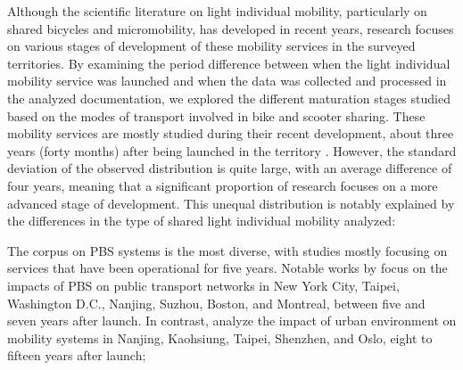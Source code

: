 \begin{refsegment}
Although the scientific literature on light individual mobility, particularly on shared bicycles and micromobility, has developed in recent years, research focuses on various stages of development of these mobility services in the surveyed territories. By examining the period difference between when the light individual mobility service was launched and when the data was collected and processed in the analyzed documentation, we explored the different maturation stages studied based on the modes of transport involved in bike and scooter sharing. These mobility services are mostly studied during their recent development, about three years (forty months) after being launched in the territory \textcolor{blue}{\autocite[298]{zhang_built_2023}}. However, the standard deviation of the observed distribution is quite large, with an average difference of four years, meaning that a significant proportion of research focuses on a more advanced stage of development. This unequal distribution is notably explained by the differences in the type of shared light individual mobility analyzed:
    \begin{customitemize}
        \item The corpus on \acrshort{PBS} systems is the most diverse, with studies mostly focusing on services that have been operational for five years. Notable works by \textcolor{blue}{\textcite{aljeri_impacts_2020, andersson_neighbourhood_2021, ma_estimating_2019, ashraf_impacts_2021, liu_understanding_2020, kuijk_preferences_2022, gu_measuring_2019, kong_deciphering_2020, radzimski_exploring_2021, romm_differences_2022, tarpin-pitre_typology_2020}} focus on the impacts of \acrshort{PBS} on public transport networks in New York City, Taipei, Washington D.C., Nanjing, Suzhou, Boston, and Montreal, between five and seven years after launch. In contrast, \textcolor{blue}{\textcite{cheng_promoting_2022, cheng_expanding_2018, yen_how_2023, tang_uncovering_2021, bocker_bike_2020}} analyze the impact of urban environment on mobility systems in Nanjing, Kaohsiung, Taipei, Shenzhen, and Oslo, eight to fifteen years after launch;

\end{customitemize}
\end{refsegment}
